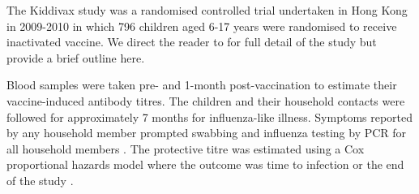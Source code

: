 The Kiddivax study was a randomised controlled trial undertaken in Hong Kong in 2009-2010 in which 796 children aged 6-17 years were randomised to receive inactivated vaccine. We direct the reader to \citep{Cowling;2013} for full detail of the study but provide a brief outline here.

Blood samples were taken pre- and 1-month post-vaccination to estimate their vaccine-induced antibody titres.  The children and their household contacts were followed for approximately 7 months for influenza-like illness. Symptoms reported by any household member prompted swabbing and influenza testing by PCR for all household members \citep{Cowling;2013}. The protective titre was estimated using a Cox proportional hazards model where the outcome was time to infection or the end of the study \cite{Ng;2013}.
